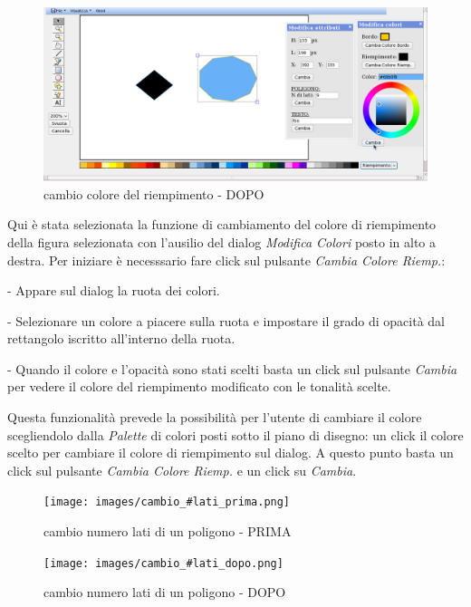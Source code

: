 \begin{figure}[!ht]
\centering
\includegraphics[scale=4]{images/colore_riempimento_dopo.png}
\caption{cambio colore del riempimento  - DOPO}
\end{figure} 


\vspace{100pt}
Qui \`e stata selezionata la funzione di cambiamento del colore di riempimento della figura selezionata con l'ausilio del dialog \textit{Modifica Colori} posto in alto a destra. Per iniziare \`e necesssario fare click sul pulsante \textit{Cambia Colore Riemp.}: 
\begin{elencopuntato}[\normindent]
\item[-] Appare sul dialog la ruota dei colori.
\item[-] Selezionare un colore a piacere sulla ruota e impostare il grado di opacit\`a dal rettangolo iscritto all'interno della ruota. 
\item[-]Quando il colore e l'opacit\`a sono stati scelti basta un click sul pulsante \textit{Cambia} per vedere il colore del riempimento modificato con le tonalit\`a scelte. 
\end{elencopuntato}
Questa funzionalit\`a prevede la possibilit\`a per l'utente di cambiare il colore scegliendolo dalla \textit{Palette} di colori posti sotto il piano di disegno: un click il colore scelto per cambiare il colore di riempimento sul dialog. A questo punto basta un click sul pulsante \textit{Cambia Colore Riemp.} e un click su \textit{Cambia}.



\begin{figure}[!ht]
\centering
\texttt{[image: images/cambio\_\#lati\_prima.png]}
\caption{cambio numero lati di un poligono  - PRIMA}
\end{figure} 

\begin{figure}[!ht]
\centering
\texttt{[image: images/cambio\_\#lati\_dopo.png]}
\caption{cambio numero lati di un poligono  - DOPO}
\end{figure} 


